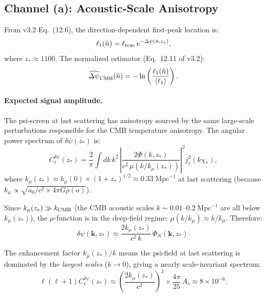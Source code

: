 \documentclass[11pt,a4paper]{article}
\newcounter{findingctr}
\newenvironment{finding}[1][]{%
  \refstepcounter{findingctr}%
  \begin{tcolorbox}[colback=blue!3!white, colframe=blue!50!black,
    title=\textbf{Finding \thefindingctr: #1}]
}{%
  \end{tcolorbox}%
}
\newcommand{\Dpsi}{\Delta\psi}
\begin{document}
\begin{finding}[\textbf{CMB}: Three Independent DFD Signatures]
\label{find:cmb}

\subsection*{Channel (a): Acoustic-Scale Anisotropy}

From v3.2 Eq.~(12.6), the direction-dependent first-peak location is:
\begin{equation}
\ell_1(\hat{n}) = \ell_{\rm true}\,e^{-\Dpsi(\hat{n}; z_*)},
\end{equation}
where $z_* \approx 1100$.  The normalized estimator (Eq.~12.11 of v3.2):
\begin{equation}
\widehat{\Dpsi}_{\rm CMB}(\hat{n}) = -\ln\left(
\frac{\ell_1(\hat{n})}{\langle\ell_1\rangle}\right).
\end{equation}

\paragraph{Expected signal amplitude.}
The psi-screen at last scattering has anisotropy sourced by the same
large-scale perturbations responsible for the CMB temperature
anisotropy.  The angular power spectrum of $\delta\psi(z_*)$ is:
\begin{equation}
C_\ell^{\delta\psi}(z_*) = \frac{2}{\pi}\int dk\,k^2\,
\left|\frac{2\Phi(k,z_*)}{c^2\,\mu(k/k_\mu(z_*))}\right|^2
j_\ell^2(k\chi_*),
\end{equation}
where $k_\mu(z_*) \approx k_\mu(0) \times (1+z_*)^{1/2} \approx
0.33\;\text{Mpc}^{-1}$ at last scattering (because $k_\mu \propto
\sqrt{a_0/c^2 \times 4\pi G \bar{\rho}(a)}$).

Since $k_\mu(z_*) \gg k_{\rm CMB}$ (the CMB acoustic scales
$k \sim 0.01$--$0.2\;\text{Mpc}^{-1}$ are all below $k_\mu(z_*)$),
the $\mu$-function is in the deep-field regime: $\mu(k/k_\mu) \approx
k/k_\mu$.  Therefore:
\begin{equation}
\delta\psi(\mathbf{k}, z_*) \approx \frac{2k_\mu(z_*)}{c^2\,k}\,
\Phi_N(\mathbf{k}, z_*).
\end{equation}

The enhancement factor $k_\mu(z_*)/k$ means the psi-field at last
scattering is dominated by the \emph{largest scales} ($k \to 0$),
giving a nearly scale-invariant spectrum:
\begin{equation}
\ell(\ell+1)C_\ell^{\delta\psi}(z_*) \approx
\left(\frac{2k_\mu(z_*)}{c^2}\right)^2 \times
\frac{4\pi}{25}\,A_s \approx 8 \times 10^{-6}.
\end{equation}


\end{finding}
\end{document}
